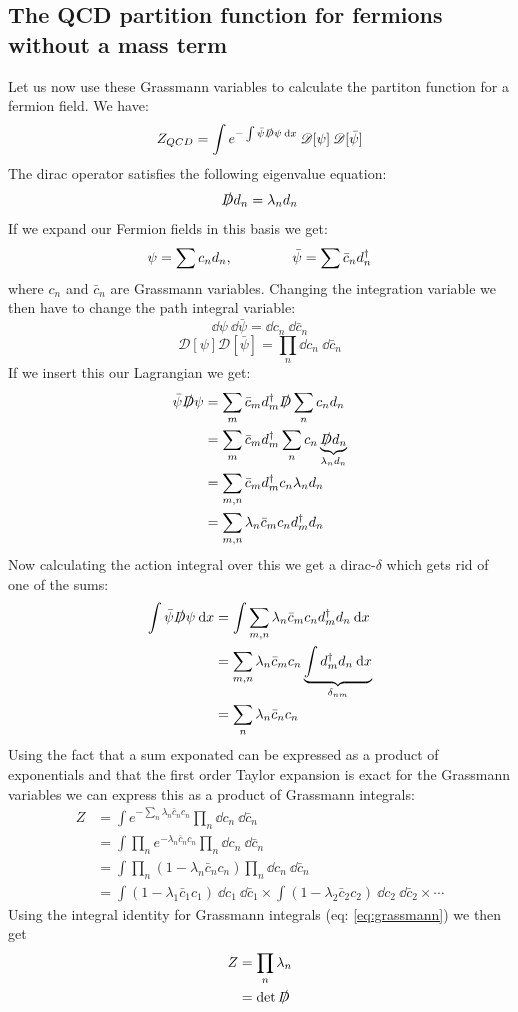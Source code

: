 \documentclass[a4,10pt,titlepage]{article}
\renewcommand\[{\begin{equation*}}
\renewcommand\]{\end{equation*}}
\newcommand{\be}{\begin{equation}}
\newcommand{\ee}{\end{equation}}
\numberwithin{equation}{section}
\newcommand{\PD}{\mathscr{D}}
\newcommand{\lp}{\left}
\newcommand{\rp}{\right}
\newcommand{\D}{\slashed{D}}
\begin{document}
\subsection{The QCD partition function for fermions without a mass term}
Let us now use these Grassmann variables to calculate the partiton function for a fermion field. We have:
\be
Z_{QCD}=\int e^{-\int \bar \psi \D \psi\:\dd x}\:\PD[\psi]\:\PD[\bar\psi]
\ee
The dirac operator satisfies the following eigenvalue equation:
\be
\D d_n=\lambda_n d_n
\ee
If we expand our Fermion fields in this basis we get:
\be
\psi=\sum c_n d_n,\hspace*{1.5cm}\bar\psi=\sum \bar c_n d_n^\dagger
\ee
where $c_n$ and $\bar c_n$ are Grassmann variables. Changing the integration variable we then have to change the path integral variable:
\[
\dd\psi\:\dd\bar\psi=\dd c_n\: \dd\bar c_n
\]
\be
\PD[\psi]\PD[\bar\psi]=\prod_{n}\dd c_n\:\dd\bar c_n
\ee
If we insert this our Lagrangian we get:
\begin{align}
\bar\psi \D \psi&=\sum_m \bar c_m d_m^\dagger \D \sum_n c_n d_n\nonumber\\
&=\sum_m \bar c_m d_m^\dagger \sum_n c_n \underbrace{\D d_n}_{\lambda_n d_n}\nonumber\\
&=\sum_{m,n} \bar c_m d_m^\dagger c_n \lambda_n d_n\nonumber\\
&=\sum_{m,n}   \lambda_n \bar c_m c_n d_m^\dagger d_n
\end{align}
Now calculating the action integral over this we get a dirac-$\delta$ which gets rid of one of the sums:
\begin{align}
\int \bar\psi \D \psi \:\dd x&=\int \sum_{m,n}   \lambda_n \bar c_m c_n d_m^\dagger d_n \:\dd x \nonumber\\
&= \sum_{m,n}   \lambda_n \bar c_m c_n \underbrace{\int d_m^\dagger d_n \:\dd x}_{\delta_{nm}} \nonumber\\
&=\sum_{n}   \lambda_n \bar c_n c_n
\end{align}
Using the fact that a sum exponated can be expressed as a product of exponentials and that the first order Taylor expansion is exact for the Grassmann variables we can express this as a product of Grassmann integrals:
\begin{align}
Z&=\int e^{-\sum_{n}   \lambda_n \bar c_n c_n}\prod_{n}\dd c_n\:\dd\bar c_n\nonumber\\
&=\int\prod_n  e^{  -\lambda_n \bar c_n c_n}\prod_{n}\dd c_n\:\dd\bar c_n\nonumber\\
&= \int\prod_n  \lp(1-\lambda_n \bar c_n c_n\rp)\prod_{n}\dd c_n\:\dd\bar c_n\nonumber\\
&=\int (1-\lambda_1\bar c_1c_1)\:\dd c_1\:\dd\bar c_1\times \int (1-\lambda_2\bar c_2c_2)\:\dd c_2\:\dd\bar c_2 \times \cdots
\end{align}
Using the integral identity for Grassmann integrals (eq: \ref{eq:grassmann}) we then get
\begin{align}
Z&=\prod_n \lambda_n\nonumber\\
&=\det\D
\end{align}
\end{document}
